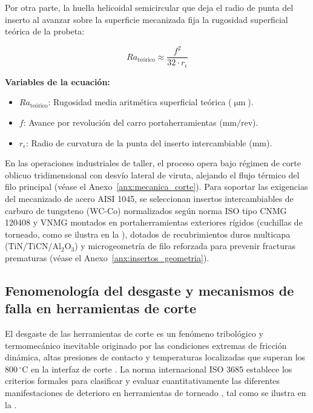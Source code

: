 Por otra parte, la huella helicoidal semicircular que deja el radio de punta del inserto al avanzar sobre la superficie mecanizada fija la rugosidad superficial teórica de la probeta:

\begin{equation}
Ra_{\text{teórico}} \approx \frac{f^2}{32 \cdot r_\epsilon}
\label{eq:rugosidad_teorica}
\end{equation}

\noindent\textbf{Variables de la ecuación:}
\begin{itemize}
    \item $Ra_{\text{teórico}}$: Rugosidad media aritmética superficial teórica ($\upmu\text{m}$).
    \item $f$: Avance por revolución del carro portaherramientas ($\text{mm/rev}$).
    \item $r_\epsilon$: Radio de curvatura de la punta del inserto intercambiable ($\text{mm}$).
\end{itemize}

En las operaciones industriales de taller, el proceso opera bajo régimen de corte oblicuo tridimensional con desvío lateral de viruta, alejando el flujo térmico del filo principal (véase el Anexo~\ref{anx:mecanica_corte}). Para soportar las exigencias del mecanizado de acero AISI 1045, se seleccionan insertos intercambiables de carburo de tungsteno (WC-Co) normalizados según norma ISO tipo CNMG 120408 y VNMG montados en portaherramientas exteriores rígidos (cuchillas de torneado, como se ilustra en la ), dotados de recubrimientos duros multicapa (TiN/TiCN/Al$_2$O$_3$) y microgeometría de filo reforzada para prevenir fracturas prematuras (véase el Anexo~\ref{anx:insertos_geometria}).


\subsection{Fenomenología del desgaste y mecanismos de falla en herramientas de corte}
\label{subsec:fenomenologia_desgaste}

El desgaste de las herramientas de corte es un fenómeno tribológico y termomecánico inevitable originado por las condiciones extremas de fricción dinámica, altas presiones de contacto y temperaturas localizadas que superan los 800\,$^\circ\text{C}$ en la interfaz de corte \citep{trent2000, ramirez2018}. La norma internacional ISO 3685 establece los criterios formales para clasificar y evaluar cuantitativamente las diferentes manifestaciones de deterioro en herramientas de torneado \citep{iso3685}, tal como se ilustra en la .

